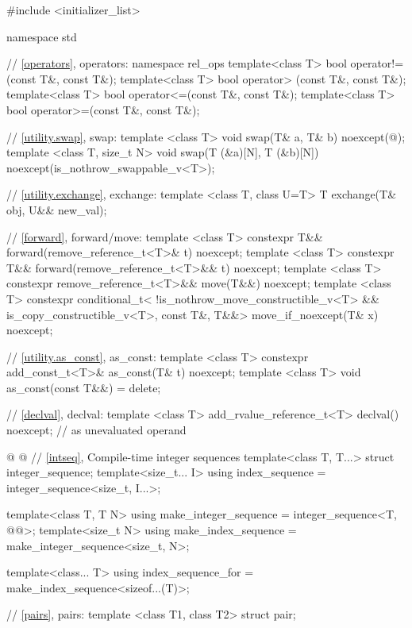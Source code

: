 \begin{codeblock}
#include <initializer_list>

namespace std {
  // \ref{operators}, operators:
  namespace rel_ops {
    template<class T> bool operator!=(const T&, const T&);
    template<class T> bool operator> (const T&, const T&);
    template<class T> bool operator<=(const T&, const T&);
    template<class T> bool operator>=(const T&, const T&);
  }

  // \ref{utility.swap}, swap:
  template <class T> void swap(T& a, T& b) noexcept(@\seebelow@);
  template <class T, size_t N> void swap(T (&a)[N], T (&b)[N]) noexcept(is_nothrow_swappable_v<T>);

  // \ref{utility.exchange}, exchange:
  template <class T, class U=T> T exchange(T& obj, U&& new_val);

  // \ref{forward}, forward/move:
  template <class T> 
    constexpr T&& forward(remove_reference_t<T>& t) noexcept;
  template <class T>
    constexpr T&& forward(remove_reference_t<T>&& t) noexcept;
  template <class T>
    constexpr remove_reference_t<T>&& move(T&&) noexcept;
  template <class T>
    constexpr conditional_t<
    !is_nothrow_move_constructible_v<T> && is_copy_constructible_v<T>,
    const T&, T&&> move_if_noexcept(T& x) noexcept;

  // \ref{utility.as_const}, as_const:
  template <class T> constexpr add_const_t<T>& as_const(T& t) noexcept;
  template <class T> void as_const(const T&&) = delete;

  // \ref{declval}, declval:
  template <class T>
    add_rvalue_reference_t<T> declval() noexcept;  // as unevaluated operand

@
%
%
%
@
  // \ref{intseq}, Compile-time integer sequences
  template<class T, T...> struct integer_sequence;
  template<size_t... I>
    using index_sequence = integer_sequence<size_t, I...>;

  template<class T, T N>
    using make_integer_sequence = integer_sequence<T, @\seebelow{}@>;
  template<size_t N>
    using make_index_sequence = make_integer_sequence<size_t, N>;

  template<class... T>
    using index_sequence_for = make_index_sequence<sizeof...(T)>;

  // \ref{pairs}, pairs:
  template <class T1, class T2> struct pair;

}
\end{codeblock}

